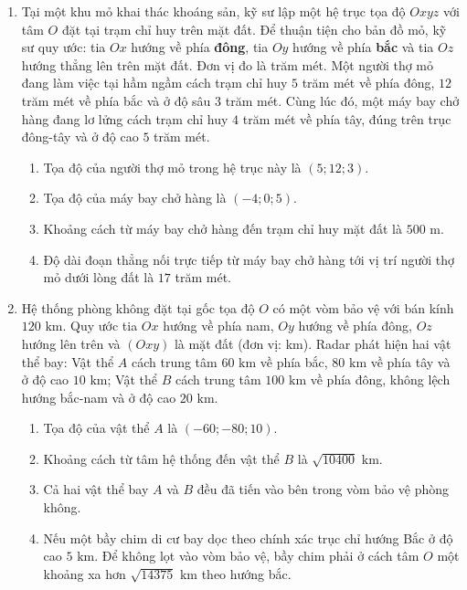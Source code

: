 \documentclass[12pt]{article}
\begin{document}
\begin{enumerate}[label=\textbf{Câu \arabic*:}, leftmargin=*]
		\vspace{3mm}
		\item Tại một khu mỏ khai thác khoáng sản, kỹ sư lập một hệ trục tọa độ $Oxyz$ với tâm $O$ đặt tại trạm chỉ huy trên mặt đất. Để thuận tiện cho bản đồ mỏ, kỹ sư quy ước: tia $Ox$ hướng về phía \textbf{đông}, tia $Oy$ hướng về phía \textbf{bắc} và tia $Oz$ hướng thẳng lên trên mặt đất. Đơn vị đo là trăm mét. Một người thợ mỏ đang làm việc tại hầm ngầm cách trạm chỉ huy $5$ trăm mét về phía đông, $12$ trăm mét về phía bắc và ở độ sâu $3$ trăm mét. Cùng lúc đó, một máy bay chở hàng đang lơ lửng cách trạm chỉ huy $4$ trăm mét về phía tây, đúng trên trục đông-tây và ở độ cao $5$ trăm mét.
		\begin{enumerate}[label=\alph*)]
			\item Tọa độ của người thợ mỏ trong hệ trục này là $(5; 12; 3)$.
			\item Tọa độ của máy bay chở hàng là $(-4; 0; 5)$.
			\item Khoảng cách từ máy bay chở hàng đến trạm chỉ huy mặt đất là $500\text{ m}$.
			\item Độ dài đoạn thẳng nối trực tiếp từ máy bay chở hàng tới vị trí người thợ mỏ dưới lòng đất là $17$ trăm mét.
		\end{enumerate}
		
		\vspace{3mm}
		\item Hệ thống phòng không đặt tại gốc tọa độ $O$ có một vòm bảo vệ với bán kính $120\text{ km}$. Quy ước tia $Ox$ hướng về phía nam, $Oy$ hướng về phía đông, $Oz$ hướng lên trên và $(Oxy)$ là mặt đất (đơn vị: km). Radar phát hiện hai vật thể bay: Vật thể $A$ cách trung tâm $60\text{ km}$ về phía bắc, $80\text{ km}$ về phía tây và ở độ cao $10\text{ km}$; Vật thể $B$ cách trung tâm $100\text{ km}$ về phía đông, không lệch hướng bắc-nam và ở độ cao $20\text{ km}$.
		\begin{enumerate}[label=\alph*)]
			\item Tọa độ của vật thể $A$ là $(-60; -80; 10)$.
			\item Khoảng cách từ tâm hệ thống đến vật thể $B$ là $\sqrt{10400}\text{ km}$.
			\item Cả hai vật thể bay $A$ và $B$ đều đã tiến vào bên trong vòm bảo vệ phòng không.
			\item Nếu một bầy chim di cư bay dọc theo chính xác trục chỉ hướng Bắc ở độ cao $5\text{ km}$. Để không lọt vào vòm bảo vệ, bầy chim phải ở cách tâm $O$ một khoảng xa hơn $\sqrt{14375}\text{ km}$ theo hướng bắc.
		\end{enumerate}
		

\end{enumerate}
\end{document}
